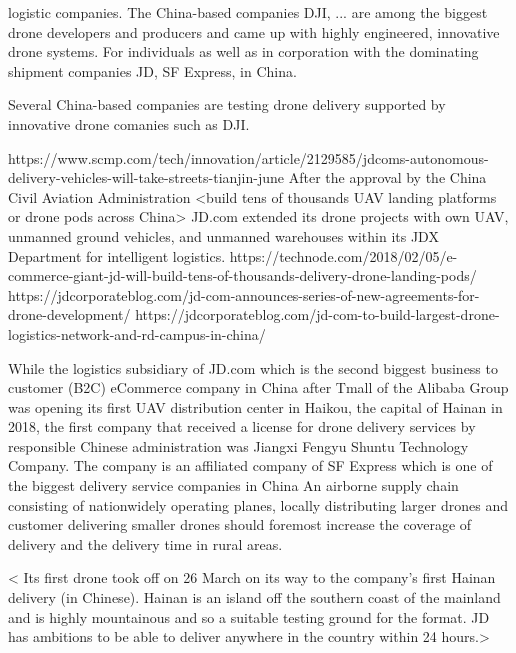 
logistic companies.
The China-based companies DJI, ... are among the biggest drone developers and producers
and came up with highly engineered, innovative drone systems.
For individuals as well as in corporation with the
dominating shipment companies JD, SF Express, in China.

Several China-based companies 
are testing drone delivery supported by
innovative drone comanies such as DJI.


https://www.scmp.com/tech/innovation/article/2129585/jdcoms-autonomous-delivery-vehicles-will-take-streets-tianjin-june
After the approval by the China Civil Aviation Administration
<build tens of thousands UAV landing platforms or drone pods across China>
JD.com extended its drone projects
with own UAV, unmanned ground vehicles, and unmanned warehouses
within its JDX Department for intelligent logistics.
https://technode.com/2018/02/05/e-commerce-giant-jd-will-build-tens-of-thousands-delivery-drone-landing-pods/
https://jdcorporateblog.com/jd-com-announces-series-of-new-agreements-for-drone-development/
https://jdcorporateblog.com/jd-com-to-build-largest-drone-logistics-network-and-rd-campus-in-china/


While the logistics subsidiary of JD.com
which is the second biggest business to customer (B2C) eCommerce company
in China after Tmall of the Alibaba Group
was opening its first UAV distribution center in Haikou, the capital of Hainan in 2018,
the first company that received a license for drone delivery services
by responsible Chinese administration was Jiangxi Fengyu Shuntu Technology Company.
The company is an affiliated company of SF Express 
which is one of the biggest delivery service companies in China 
An airborne supply chain consisting of nationwidely operating planes,
locally distributing larger drones and customer delivering smaller drones
should foremost increase the coverage of delivery and
the delivery time in rural areas.

<
Its first drone took off on 26 March on its way to the company’s first Hainan delivery (in Chinese). Hainan is an island off the southern coast of the mainland and is highly mountainous and so a suitable testing ground for the format. JD has ambitions to be able to deliver anywhere in the country within 24 hours.>



